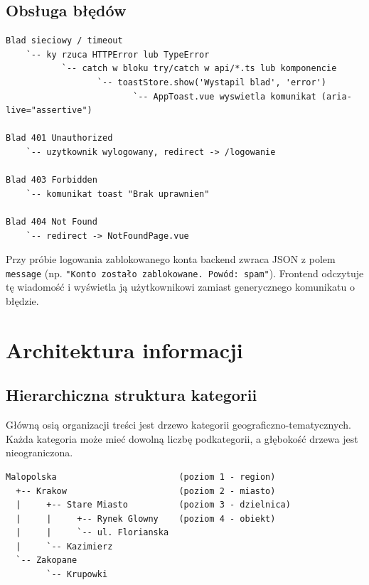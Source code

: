 \documentclass[12pt, a4paper]{article}
\begin{document}
\subsection{Obsługa błędów}

\begin{lstlisting}[style=plain, caption={Hierarchia obsługi błędów}]
Blad sieciowy / timeout
    `-- ky rzuca HTTPError lub TypeError
           `-- catch w bloku try/catch w api/*.ts lub komponencie
                  `-- toastStore.show('Wystapil blad', 'error')
                         `-- AppToast.vue wyswietla komunikat (aria-live="assertive")

Blad 401 Unauthorized
    `-- uzytkownik wylogowany, redirect -> /logowanie

Blad 403 Forbidden
    `-- komunikat toast "Brak uprawnien"

Blad 404 Not Found
    `-- redirect -> NotFoundPage.vue
\end{lstlisting}

Przy próbie logowania zablokowanego konta backend zwraca JSON z polem \texttt{message}
(np. \texttt{"Konto zostało zablokowane. Powód: spam"}). Frontend odczytuje tę wiadomość
i wyświetla ją użytkownikowi zamiast generycznego komunikatu o błędzie.

\section{Architektura informacji}

\subsection{Hierarchiczna struktura kategorii}

Główną osią organizacji treści jest drzewo kategorii geograficzno-tematycznych.
Każda kategoria może mieć dowolną liczbę podkategorii, a głębokość drzewa jest
nieograniczona.

\begin{lstlisting}[style=plain, caption={Przykładowa hierarchia kategorii}]
Malopolska                        (poziom 1 - region)
  +-- Krakow                      (poziom 2 - miasto)
  |     +-- Stare Miasto          (poziom 3 - dzielnica)
  |     |     +-- Rynek Glowny    (poziom 4 - obiekt)
  |     |     `-- ul. Florianska
  |     `-- Kazimierz
  `-- Zakopane
        `-- Krupowki
\end{lstlisting}
\end{document}
